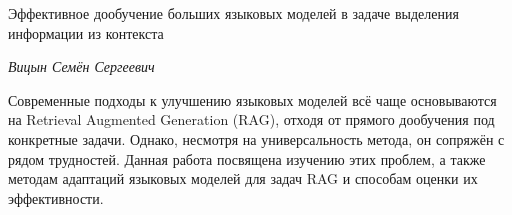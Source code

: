 \begin{center}
    \large{Эффективное дообучение больших языковых моделей в задаче выделения информации из контекста} \\
\end{center}

\begin{center}
    \large\textit{Вицын Семён Сергеевич} \\[1 cm]
\end{center}

Современные подходы к улучшению языковых моделей всё чаще основываются на Retrieval Augmented Generation (RAG), отходя от прямого дообучения под конкретные задачи. Однако, несмотря на универсальность метода, он сопряжён с рядом трудностей. Данная работа посвящена изучению этих проблем, а также методам адаптаций языковых моделей для задач RAG и способам оценки их эффективности.

\vfill

\newpage